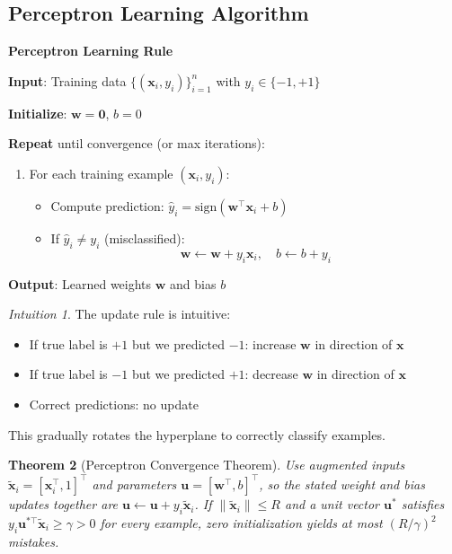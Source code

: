 \documentclass[11pt,twoside]{article}
\numberwithin{equation}{section}
\newcommand{\vect}[1]{\bm{#1}}
\newcommand{\norm}[1]{\left\lVert#1\right\rVert}
\theoremstyle{plain}
\newtheorem{theorem}{Theorem}[section]
\theoremstyle{definition}
\theoremstyle{remark}
\newtheorem{intuition}[theorem]{Intuition}
\begin{document}
\subsection{Perceptron Learning Algorithm}

\begin{algorithmbox}
\textbf{Perceptron Learning Rule}

\textbf{Input}: Training data $\{(\vect{x}_i, y_i)\}_{i=1}^n$ with $y_i \in \{-1, +1\}$

\textbf{Initialize}: $\vect{w} = \vect{0}$, $b = 0$

\textbf{Repeat} until convergence (or max iterations):
\begin{enumerate}
\item For each training example $(\vect{x}_i, y_i)$:
\begin{itemize}
\item Compute prediction: $\hat{y}_i = \text{sign}(\vect{w}^\top\vect{x}_i + b)$
\item If $\hat{y}_i \neq y_i$ (misclassified):
\[
\vect{w} \leftarrow \vect{w} + y_i\vect{x}_i, \quad b \leftarrow b + y_i
\]
\end{itemize}
\end{enumerate}

\textbf{Output}: Learned weights $\vect{w}$ and bias $b$
\end{algorithmbox}

\begin{intuition}
The update rule is intuitive:
\begin{itemize}
\item If true label is $+1$ but we predicted $-1$: increase $\vect{w}$ in direction of $\vect{x}$
\item If true label is $-1$ but we predicted $+1$: decrease $\vect{w}$ in direction of $\vect{x}$
\item Correct predictions: no update
\end{itemize}
This gradually rotates the hyperplane to correctly classify examples.
\end{intuition}

\begin{theorem}[Perceptron Convergence Theorem]
Use augmented inputs $\tilde{\vect{x}}_i=[\vect{x}_i^\top,1]^\top$ and parameters $\vect{u}=[\vect{w}^\top,b]^\top$, so the stated weight and bias updates together are $\vect{u}\leftarrow\vect{u}+y_i\tilde{\vect{x}}_i$. If $\norm{\tilde{\vect{x}}_i}\leq R$ and a unit vector $\vect{u}^*$ satisfies $y_i\vect{u}^{*\top}\tilde{\vect{x}}_i\geq\gamma>0$ for every example, zero initialization yields at most $(R/\gamma)^2$ mistakes.
\end{theorem}
\end{document}
